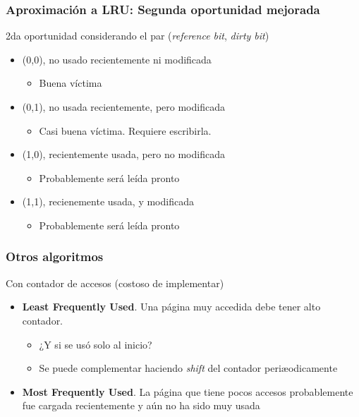 \documentclass[letter]{beamer}
\begin{document}
\begin{frame}
  \frametitle{Aproximación a LRU: Segunda oportunidad mejorada}

  2da oportunidad considerando el par ({\em reference bit}, {\em dirty bit})
  
  \begin{itemize}
    \item (0,0), no usado recientemente ni modificada
      \begin{itemize}
        \item Buena víctima
      \end{itemize}
    \item (0,1), no usada recientemente, pero modificada
      \begin{itemize}
        \item Casi buena víctima. Requiere escribirla.
      \end{itemize}
    \item (1,0), recientemente usada, pero no modificada
      \begin{itemize}
        \item Probablemente será leída pronto
      \end{itemize}
    \item (1,1), recienemente usada, y modificada
      \begin{itemize}
        \item Probablemente será leída pronto
      \end{itemize}
  \end{itemize}

\end{frame}

\begin{frame}
  \frametitle{Otros algoritmos}
  
  Con contador de accesos (costoso de implementar)
  \begin{itemize}
    \item {\bf Least Frequently Used}. Una página muy accedida debe tener alto contador.
       \begin{itemize}
         \item ¿Y si se usó solo al inicio?
         \item Se puede complementar haciendo {\em shift} del contador periæodicamente
       \end{itemize}
    \item {\bf Most Frequently Used}. La página que tiene pocos accesos probablemente fue cargada recientemente
          y aún no ha sido muy usada
  \end{itemize}
\end{frame}
\end{document}
